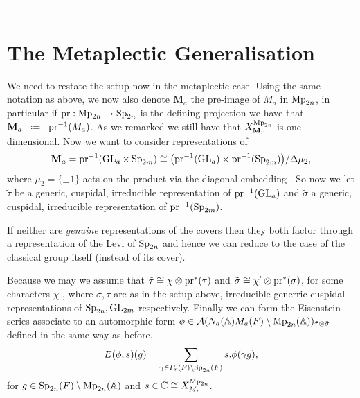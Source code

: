     --------

    \begin{Theorem}
        
    \end{Theorem}

    


    \section{The Metaplectic Generalisation}
    We need to restate the setup now in the metaplectic case. Using the same notation as above, we now also denote \(\mathbf{M}_a\) the pre-image of \(M_a\) in \(\operatorname{Mp}_{2n}\), in particular if \(\mathrm{pr}: \operatorname{Mp}_{2n} \to \operatorname{Sp}_{2n}\) is the defining projection we have that \(\mathbf{M}_a \defeq \mathrm{pr}\inv(M_a)\). As we remarked  we still have that \(X_{\mathbf{M}_r}^{\operatorname{Mp}_{2n}}\) is one dimensional. Now we want to consider representations of 
    \[\mathbf{M}_a = \mathrm{pr}^{-1}(\operatorname{GL}_a \times \operatorname{Sp}_{2m}) \cong \big(\mathrm{pr}^{-1}(\operatorname{GL}_a)\times \mathrm{pr}^{-1}(\operatorname{Sp}_{2m})\big)/\Delta \mu_2,\]
    where \(\mu_2 = \{\pm 1\}\) acts on the product via the diagonal embedding .
    So now we let \(\tilde{\tau}\) be a generic, cuspidal, irreducible representation of \(\mathrm{pr}^{-1}(\operatorname{GL}_a)\) and \(\tilde{\sigma}\) a generic, cuspidal, irreducible representation of \(\mathrm{pr}^{-1}(\operatorname{Sp}_{2m})\). 

    \begin{remark}
        If neither are \textit{genuine} representations of the covers then they both factor through a representation of the Levi of \(\operatorname{Sp}_{2n}\) and hence we can reduce to the case of the classical group itself (instead of its cover).
    \end{remark}

    Because we may  we assume that \(\tilde{\tau} \cong \chi\otimes \mathrm{pr}^*(\tau)\) and \(\tilde{\sigma} \cong \chi'\otimes \mathrm{pr}^*(\sigma)\), for some characters \(\chi\) , where \(\sigma, \tau\) are as in the setup above, irreducible generric cuspidal representations of \(\operatorname{Sp}_{2n}, \operatorname{GL}_{2m}\) respectively.
    Finally we can form the Eisenstein series associate to an automorphic form \(\phi\in \mathcal{A}(N_a(\A)M_a(F)\setminus \Mp_{2n}(\A) )_{\tilde{\tau}\tensor \tilde\sigma}\) defined in the same way as before,
    \[E(\phi, s)(g) = \sum_{\gamma\in P_r(F) \setminus \Sp_{2n}(F)} s.\phi(\gamma g),\]
    for \(g\in \Sp_{2n}(F) \setminus \Mp_{2n}(\A)\) and \(s\in \C \cong X^{\Mp_{2n}}_{M_r}\).

